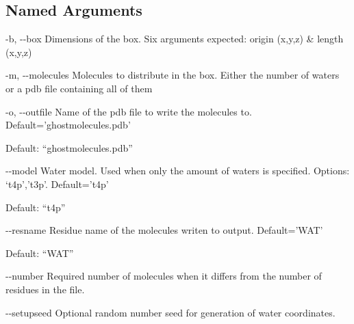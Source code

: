 \documentclass[letterpaper,10pt,english]{sphinxmanual}
\begin{document}
\subsection{Named Arguments}
\label{\detokenize{tools:Named Arguments}}\begin{optionlist}{3cm}
\item [-b, -{-}box]  
Dimensions of the box. Six arguments expected: origin (x,y,z) \& length (x,y,z)
\item [-m, -{-}molecules]  
Molecules to distribute in the box. Either the number of waters or a pdb file containing all of them
\item [-o, -{-}outfile]  
Name of the pdb file to write the molecules to. Default=’ghostmolecules.pdb’

Default: “ghostmolecules.pdb”
\item [-{-}model]  
Water model. Used when only the amount of waters is specified. Options: ‘t4p’,’t3p’. Default=’t4p’

Default: “t4p”
\item [-{-}resname]  
Residue name of the molecules writen to output. Default=’WAT’

Default: “WAT”
\item [-{-}number]  
Required number of molecules when it differs from the number of residues in the file.
\item [-{-}setupseed]  
Optional random number seed for generation of water coordinates.
\end{optionlist}


%
\begin{sphinxVerbatim}[commandchars=\\\{\}]
         
             
             
\end{sphinxVerbatim}
\end{document}
